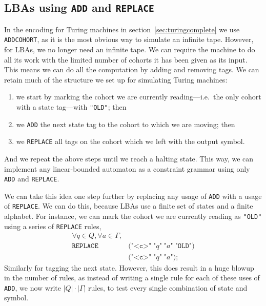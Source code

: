 \documentclass[11pt]{article}
\def\t#1{\texttt{#1}}
\begin{document}
\subsection{LBAs using \t{ADD} and \t{REPLACE}}
In the encoding for Turing machines in section~\ref{sec:turingcomplete} we use
\t{ADDCOHORT}, as it is the most obvious way to simulate an infinite tape.
However, for LBAs, we no longer need an infinite tape. We can require the
machine to do all its work with the limited number of cohorts it has been given
as its input. This means we can do all the computation by adding and removing
tags. We can retain much of the structure we set up for simulating Turing
machines:
\begin{enumerate}
\item%
  we start by marking the cohort we are currently reading---i.e.\ the only
  cohort with a state tag---with \t{"OLD"}; then 
\item%
  we \t{ADD} the next state tag to the cohort to which we are moving; then
\item%
  we \t{REPLACE} all tags on the cohort which we left with the output symbol.
\end{enumerate}
And we repeat the above steps until we reach a halting state. This way, we can
implement any linear-bounded automaton as a constraint grammar using only
\t{ADD} and \t{REPLACE}.

We can take this idea one step further by replacing any usage of \t{ADD} with a
usage of \t{REPLACE}. We can do this, because LBAs use a finite set of states
and a finite alphabet. For instance, we can mark the cohort we are currently
reading as \t{"OLD"} using a series of \t{REPLACE} rules,
\[
  \begin{aligned}
    \forall q \in Q, \forall a \in \Gamma,\\
    \t{REPLACE} \; &\t{(}\t{"<c>"} \; \t{"$q$"} \; \t{"$a$"} \; \t{"OLD"}\t{)}\\
                \; &\t{(}\t{"<c>"} \; \t{"$q$"} \; \t{"$a$"}\t{)}\t{;}
  \end{aligned}
\]
Similarly for tagging the next state.
However, this does result in a huge blowup in the number of rules, as instead of
writing a single rule for each of these uses of \t{ADD}, we now write $|Q| \cdot
|\Gamma|$ rules, to test every single combination of state and symbol.
\end{document}

